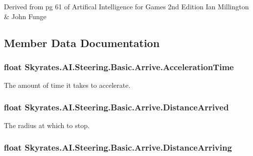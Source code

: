 Derived from pg 61 of Artifical Intelligence for Games 2nd Edition Ian Millington \& John Funge 

\subsection{Member Data Documentation}
\hypertarget{class_skyrates_1_1_a_i_1_1_steering_1_1_basic_1_1_arrive_a66e0424af3a3a898f2abdd9f3509813f}{
\subsubsection[{Acceleration\-Time}]{\setlength{\rightskip}{0pt plus 5cm}float Skyrates.\-A\-I.\-Steering.\-Basic.\-Arrive.\-Acceleration\-Time}}\label{class_skyrates_1_1_a_i_1_1_steering_1_1_basic_1_1_arrive_a66e0424af3a3a898f2abdd9f3509813f}


The amount of time it takes to accelerate. 

\hypertarget{class_skyrates_1_1_a_i_1_1_steering_1_1_basic_1_1_arrive_a6fe22533b2f3f3156418a40be017a012}{
\subsubsection[{Distance\-Arrived}]{\setlength{\rightskip}{0pt plus 5cm}float Skyrates.\-A\-I.\-Steering.\-Basic.\-Arrive.\-Distance\-Arrived}}\label{class_skyrates_1_1_a_i_1_1_steering_1_1_basic_1_1_arrive_a6fe22533b2f3f3156418a40be017a012}


The radius at which to stop. 

\hypertarget{class_skyrates_1_1_a_i_1_1_steering_1_1_basic_1_1_arrive_aa5d253b4b0b808defa2c70e3a1a18222}{
\subsubsection[{Distance\-Arriving}]{\setlength{\rightskip}{0pt plus 5cm}float Skyrates.\-A\-I.\-Steering.\-Basic.\-Arrive.\-Distance\-Arriving}}\label{class_skyrates_1_1_a_i_1_1_steering_1_1_basic_1_1_arrive_aa5d253b4b0b808defa2c70e3a1a18222}


